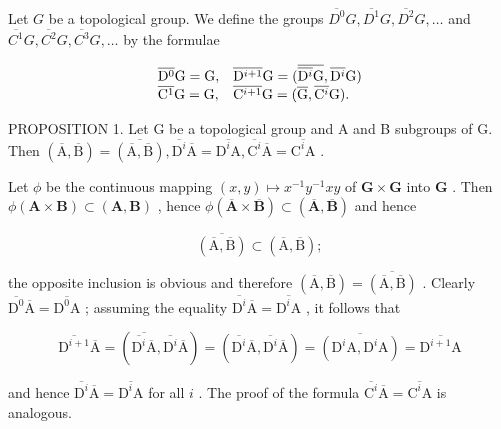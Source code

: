 Let \(G\) be a topological group. We define the groups \(\overline{D^0}G, \overline{D^1}G, \overline{D^2}G, \ldots\) and \(\overline{C^1}G, \overline{C^2}G, \overline{C^3}G, \ldots\) by the formulae

\[
\begin{array}{l l} \overline {{\mathrm{D} ^ {0}}} \mathrm{G} = \mathrm{G}, & \overline {{\mathrm{D} ^ {i + 1}}} \mathrm{G} = (\overline {{\overline {{\mathrm{D} ^ {i}}} \mathrm{G}}}, \overline {{\mathrm{D} ^ {i}}} \mathrm{G}) \\ \overline {{\mathrm{C} ^ {1}}} \mathrm{G} = \mathrm{G}, & \overline {{\mathrm{C} ^ {i + 1}}} \mathrm{G} = (\overline {{\mathrm{G}}}, \overline {{\mathrm{C} ^ {i}}} \mathrm{G}). \end{array}
\]

PROPOSITION 1. Let G be a topological group and A and B subgroups of G. Then \((\overline{\mathrm{A}},\overline{\mathrm{B}}) = \overline{(\overline{\mathrm{A}},\overline{\mathrm{B}})},\overline{\mathrm{D}^{i}}\overline{\mathrm{A}} = \overline{\mathrm{D}^{i}\mathrm{A}},\overline{\mathrm{C}^{i}}\overline{\mathrm{A}} = \overline{\mathrm{C}^{i}\mathrm{A}}\) .

Let \(\phi\) be the continuous mapping \((x,y)\mapsto x^{-1}y^{-1}xy\) of \(\mathbf{G}\times \mathbf{G}\) into \(\mathbf{G}\) . Then \(\phi (\mathbf{A}\times \mathbf{B})\subset (\mathbf{A},\mathbf{B})\) , hence \(\phi (\overline{\mathbf{A}}\times \overline{\mathbf{B}})\subset (\overline{\mathbf{A}},\overline{\mathbf{B}})\) and hence

\[
\overline{(\overline{\mathrm{A}},\overline{\mathrm{B}})} \subset (\overline{\mathrm{A}},\overline{\mathrm{B}});
\]

the opposite inclusion is obvious and therefore \((\overline{\mathrm{A}},\overline{\mathrm{B}}) = \overline{(\overline{\mathrm{A}},\overline{\mathrm{B}})}\) . Clearly \(\overline{\mathrm{D}^{0}}\overline{\mathrm{A}} = \overline{\mathrm{D}^{0}\mathrm{A}}\) ; assuming the equality \(\overline{\mathrm{D}^{i}}\overline{\mathrm{A}} = \overline{\mathrm{D}^{i}\mathrm{A}}\) , it follows that

\[
\overline{\mathrm{D}^{i+1}}\overline{\mathrm{A}} = (\overline{\overline{\mathrm{D}^{i}}\overline{\mathrm{A}}},\overline{\mathrm{D}^{i}}\overline{\mathrm{A}}) = (\overline{\mathrm{D}^{i}}\overline{\mathrm{A}},\overline{\mathrm{D}^{i}}\overline{\mathrm{A}}) = \overline{(\mathrm{D}^{i}\mathrm{A},\mathrm{D}^{i}\mathrm{A})} = \overline{\mathrm{D}^{i+1}\mathrm{A}}
\]

and hence \(\overline{\mathrm{D}^{i}}\overline{\mathrm{A}} = \overline{\mathrm{D}^{i}\mathrm{A}}\) for all \(i\) . The proof of the formula \(\overline{\mathrm{C}^{i}}\overline{\mathrm{A}} = \overline{\mathrm{C}^{i}\mathrm{A}}\) is analogous.

